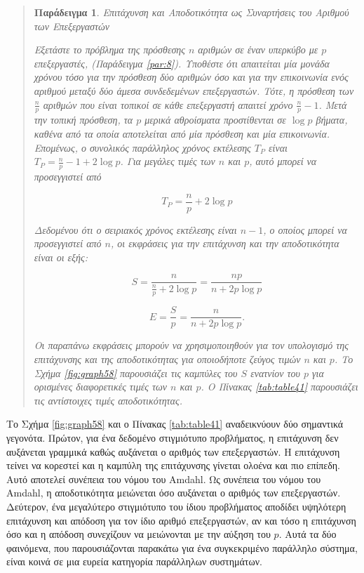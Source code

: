 \documentclass[12pt,a4paper]{article}
\newtheorem{paradeigma}{Παράδειγμα}
\begin{document}
\begin{quote}
\begin{paradeigma} \label{par:9} Επιτάχυνση και Αποδοτικότητα ως Συναρτήσεις 
του Αριθμού των Επεξεργαστών

Εξετάστε το πρόβλημα της πρόσθεσης $n$ αριθμών σε έναν υπερκύβο με $p$ 
επεξεργαστές, (Παράδειγμα \ref{par:8}). Υποθέστε ότι απαιτείται μία μονάδα 
χρόνου τόσο για την πρόσθεση δύο αριθμών όσο και για την επικοινωνία ενός 
αριθμού μεταξύ δύο άμεσα συνδεδεμένων επεξεργαστών. Τότε, η πρόσθεση των 
$\frac{n}{p}$ αριθμών που είναι τοπικοί σε κάθε επεξεργαστή απαιτεί χρόνο 
$\frac{n}{p}-1$. Μετά την τοπική πρόσθεση, τα $p$ μερικά αθροίσματα 
προστίθενται σε $\log p$ βήματα, καθένα από τα οποία αποτελείται από μία 
πρόσθεση και μία επικοινωνία. Επομένως, ο συνολικός παράλληλος χρόνος 
εκτέλεσης $T_P$ είναι \(T_P=\frac{n}{p}-1+2\log p\). Για μεγάλες τιμές 
των $n$ και $p$, αυτό μπορεί να προσεγγιστεί από

\begin{equation}
T_P = \frac{n}{p} + 2 \log p
\label{eq:relation23}
\end{equation}

Δεδομένου ότι ο σειριακός χρόνος εκτέλεσης είναι $n-1$, ο οποίος μπορεί 
να προσεγγιστεί από $n$, οι εκφράσεις για την επιτάχυνση και την 
αποδοτικότητα είναι οι εξής:

\begin{equation}
S=\frac{n}{\frac{n}{p}+2\log p}
=\frac{np}{n+2p\log p}
\label{eq:relation24}
\end{equation}

\begin{equation}
E=\frac{S}{p}
=\frac{n}{n+2p\log p}.
\label{eq:relation25}
\end{equation}

Οι παραπάνω εκφράσεις μπορούν να χρησιμοποιηθούν για τον υπολογισμό της 
επιτάχυνσης και της αποδοτικότητας για οποιοδήποτε ζεύγος τιμών $n$ και 
$p$. Το Σχήμα \ref{fig:graph58} παρουσιάζει τις καμπύλες του $S$ ενατνίον 
του $p$ για ορισμένες διαφορετικές τιμές των $n$ και $p$. Ο Πίνακας 
\ref{tab:table41} παρουσιάζει τις αντίστοιχες τιμές αποδοτικότητας.
\end{paradeigma}
\end{quote}

Το Σχήμα \ref{fig:graph58} και ο Πίνακας \ref{tab:table41} αναδεικνύουν 
δύο σημαντικά γεγονότα. Πρώτον, για ένα δεδομένο στιγμιότυπο προβλήματος, η 
επιτάχυνση δεν αυξάνεται γραμμικά καθώς αυξάνεται ο αριθμός των επεξεργαστών. 
Η επιτάχυνση τείνει να κορεστεί και η καμπύλη της επιτάχυνσης γίνεται ολοένα 
και πιο επίπεδη. Αυτό αποτελεί συνέπεια του νόμου του \foreignlanguage{english}{Amdahl}. 
Ως συνέπεια του νόμου του \foreignlanguage{english}{Amdahl}, η 
αποδοτικότητα μειώνεται όσο αυξάνεται ο αριθμός των επεξεργαστών. 
Δεύτερον, ένα μεγαλύτερο στιγμιότυπο του ίδιου προβλήματος αποδίδει
υψηλότερη επιτάχυνση και απόδοση για τον ίδιο αριθμό επεξεργαστών, αν και 
τόσο η επιτάχυνση όσο και η απόδοση συνεχίζουν να μειώνονται με την 
αύξηση του $p$. Αυτά τα δύο φαινόμενα, που παρουσιάζονται παρακάτω για 
ένα συγκεκριμένο παράλληλο σύστημα, είναι κοινά σε μια ευρεία κατηγορία 
παράλληλων συστημάτων.
\end{document}
